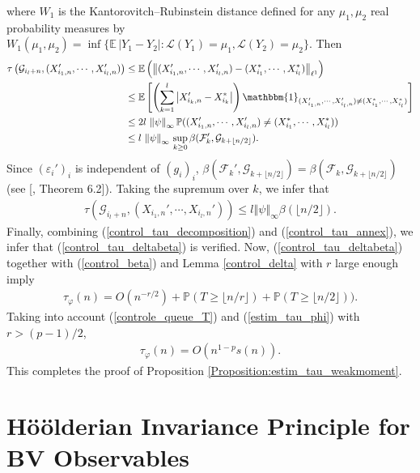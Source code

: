 \documentclass{ws-sd}
\newcommand{\E}{\mathbb{E}}
\newcommand{\Proba}{\mathbb{P}}
\newcommand{\law}{\mathcal{L}}
\newcommand{\calF}{\mathcal{F}}
\newcommand{\indic}{\mathbbm{1}}
\newcommand{\norm}[1]{\left\Vert #1\right\Vert}
\newcommand{\abs}[1]{\left\lvert #1 \right\rvert}
\newcommand\bigp[1]{\left(#1\right)}
\newcommand{\bigcro}[1]{\left[#1\right]}
\newcommand{\eps}{\varepsilon}
\begin{document}
    where $W_1$ is the Kantorovitch--Rubinstein distance defined for any $\mu_1, \mu_2$ real probability measures by $W_1(\mu_1, \mu_2) = \inf\{\E \, |Y_1-Y_2| : \law(Y_1) = \mu_1, \law(Y_2) = \mu_2\}$.
    Then
    \begin{align*}
        \tau\bigp{\mathcal G_{i_l + n}, (X_{i_1,n}', \cdots, X_{i_l,n}')}
        &\le \E\bigp{\norm{(X_{i_1,n}', \cdots, X_{i_l,n}')-(X_{i_1}^*, \cdots, X_{i_l}^*)}_{\ell^1}}
        \\
        &\le \E \bigcro{
            \bigp{\sum_{k = 1}^l \abs{X_{i_k,n}' - X_{i_k}^*}} \indic_{(X_{i_1,n}', \cdots, X_{i_l,n}') \neq (X_{i_1}^*, \cdots, X_{i_l}^*)}
        }
        \\
        &\le 2l \, \norm{\psi}_\infty \Proba((X_{i_1,n}', \cdots, X_{i_l,n}') \neq (X_{i_1}^*, \cdots, X_{i_l}^*))
        \\
        &\le
        l \, \norm{\psi}_{\infty}\, \sup_{k \ge 0} \beta(\calF _k', \mathcal G _{k + \lfloor n/2 \rfloor}).
    \end{align*}
    Since $(\eps_i')_i$ is independent of $(g_i)_i$, $\beta(\calF _k', \mathcal G _{k + \lfloor n/2 \rfloor}) = \beta(\calF _k, \mathcal G _{k + \lfloor n/2 \rfloor})$ (see [, Theorem 6.2]). Taking the supremum over $k$, we infer that
    \begin{align}
            \label{control_tau_annex}
        \tau\bigp{\mathcal G_{i_l + n}, (X_{i_1,n}', \cdots, X_{i_l,n}')} \le l \norm{\psi}_\infty  \beta(\lfloor n/2 \rfloor).
    \end{align}
    Finally, combining (\ref{control_tau_decomposition}) and (\ref{control_tau_annex}), we infer that (\ref{control_tau_deltabeta}) is verified. Now, (\ref{control_tau_deltabeta}) together with (\ref{control_beta}) and Lemma \ref{control_delta} with $r$ large enough imply
    \begin{align}\label{estim_tau_phi}
        \tau_{\varphi}(n) = O(n^{-r/2}) + \Proba(T \ge \lfloor n / r \rfloor) + \Proba(T \ge \lfloor n / 2 \rfloor)).
    \end{align}
    Taking into account (\ref{controle_queue_T}) and (\ref{estim_tau_phi}) with $r > (p-1)/2$,
    \begin{align*}
        \tau_{\varphi}(n) = O(n^{1-p}s(n)).
    \end{align*}
    This completes the proof of Proposition \ref{Proposition:estim_tau_weakmoment}.

\section{H\"oölderian Invariance Principle for BV Observables}
    \label{Section:BV}
\end{document}
